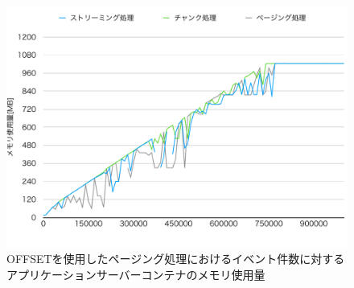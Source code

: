 \documentclass[../../../../../main]{subfiles}
\begin{document}
    \begin{figure}[H]
        \centering
        \includegraphics[width=12cm]{graph}
        \caption{OFFSETを使用したページング処理におけるイベント件数に対するアプリケーションサーバーコンテナのメモリ使用量}
        \label{fig:each-way-app-mem-app_1_1024-db_1_1024}
    \end{figure}
\end{document}

